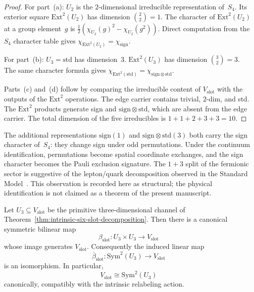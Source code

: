 \begin{proof}
For part~(a): $U_2$ is the $2$-dimensional irreducible representation
of~$S_4$. Its exterior square $\mathrm{Ext}^2(U_2)$ has dimension
$\binom{2}{2} = 1$. The character of $\mathrm{Ext}^2(U_2)$ at a group
element~$g$ is $\frac{1}{2}(\chi_{U_2}(g)^2 - \chi_{U_2}(g^2))$. Direct
computation from the $S_4$ character table gives
$\chi_{\mathrm{Ext}^2(U_2)} = \chi_{\mathrm{sign}}$.

For part~(b): $U_3 = \mathrm{std}$ has dimension~$3$.
$\mathrm{Ext}^2(U_3)$ has dimension $\binom{3}{2} = 3$. The same character
formula gives
$\chi_{\mathrm{Ext}^2(\mathrm{std})} = \chi_{\mathrm{sign} \otimes
\mathrm{std}}$.

Parts~(c) and~(d) follow by comparing the irreducible content of
$V_{\mathrm{slot}}$ with the outputs of the $\mathrm{Ext}^2$ operations.
The edge carrier contains trivial, $2$-dim, and std. The $\mathrm{Ext}^2$
products generate sign and $\mathrm{sign}\otimes\mathrm{std}$, which are
absent from the edge carrier.
The total dimension of the five irreducibles is
$1 + 1 + 2 + 3 + 3 = 10$.
\end{proof}

\begin{remark}
\label{rem:fermionic-observation}
The additional representations $\mathrm{sign}(1)$ and
$\mathrm{sign} \otimes \mathrm{std}(3)$ both carry the sign character
of~$S_4$: they change sign under odd permutations. Under the continuum
identification, permutations become spatial coordinate exchanges, and the
sign character becomes the Pauli exclusion signature. The $1 + 3$ split of
the fermionic sector is suggestive of the lepton/quark decomposition
observed in the Standard Model~\cite{PeskinSchroeder1995}. This observation is recorded here as
structural; the physical identification is not claimed as a theorem of the
present manuscript.
\end{remark}

\begin{theorem}
\label{thm:six-slot-carrier-is-symmetric-square-of-u3}
Let \(U_3\subseteq V_{\mathrm{slot}}\) be the primitive three-dimensional
channel of Theorem~\ref{thm:intrinsic-six-slot-decomposition}. Then there is a
canonical symmetric bilinear map
\[
\beta_{\mathrm{slot}}:U_3\times U_3\to V_{\mathrm{slot}}
\]
whose image generates \(V_{\mathrm{slot}}\). Consequently the induced linear map
\[
\overline\beta_{\mathrm{slot}}:\mathrm{Sym}^2(U_3)\to V_{\mathrm{slot}}
\]
is an isomorphism. In particular,
\[
V_{\mathrm{slot}}\cong \mathrm{Sym}^2(U_3)
\]
canonically, compatibly with the intrinsic relabeling action.
\end{theorem}

